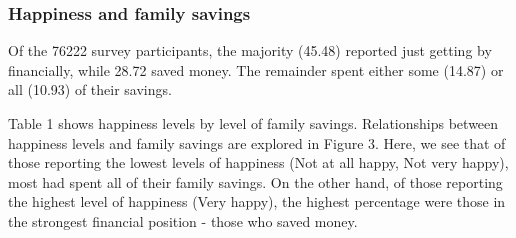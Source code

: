 \documentclass[man, fleqn, noextraspace,floatsintext]{apa6}
\begin{document}
\hypertarget{happiness-and-family-savings}{%
\subsubsection{Happiness and family savings}\label{happiness-and-family-savings}}

Of the 76222 survey participants, the majority (45.48) reported just getting by financially, while 28.72 saved money. The remainder spent either some (14.87) or all (10.93) of their savings.

Table 1 shows happiness levels by level of family savings. Relationships between happiness levels and family savings are explored in Figure 3. Here, we see that of those reporting the lowest levels of happiness (Not at all happy, Not very happy), most had spent all of their family savings. On the other hand, of those reporting the highest level of happiness (Very happy), the highest percentage were those in the strongest financial position - those who saved money.
\end{document}
